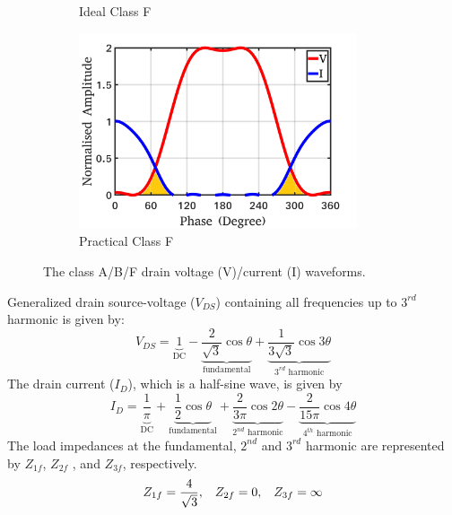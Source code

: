 \documentclass[conference]{IEEEtran}
\begin{document}
\begin{figure}[!t]
\begin{subfigure}{0.24\textwidth}
\caption{Ideal Class F}
\label{fig:ICF_wave_VI}
\end{subfigure}
\begin{subfigure}{0.24\textwidth}
\includegraphics[width=0.9\textwidth]{Images/Intro/CF_wave_VI_shaded.jpg}
\caption{Practical Class F}
\label{fig:CF_wave_VI}
\end{subfigure}
\caption{The class A/B/F drain  voltage (V)/current (I) waveforms. \color{black}}
\label{fig:wave_VI}
\vspace{-0.25in}
\end{figure}
Generalized drain source\color{blue}-\color{black}voltage ($V_{DS}$) containing all frequencies up to $3^{rd}$ harmonic \cite{Gen_Vds_eqn} is given by:
\begin{equation}
V_{DS}=\underbrace{1}_{\text{DC}}-\underbrace{\frac{2}{\sqrt{3}} \cos \theta}_{\text{fundamental}}+\underbrace{\frac{1}{3 \sqrt{3}} \cos 3 \theta}_{\text{$3^{rd}$ harmonic}}
\label{eqn_CF_V}
\end{equation}
\color{blue} The drain \color{black}  current ($I_{D}$)\color{blue}, which is a half-sine wave, \color{black} is given by
\begin{equation}
I_{D}=\underbrace{\frac{1}{\pi}}_{\text{DC}}+\underbrace{\frac{1}{2} \cos \theta}_{\text{fundamental}}+\underbrace{\frac{2}{3 \pi} \cos 2 \theta}_{\text{$2^{nd}$ harmonic}}-\underbrace{\frac{2}{15 \pi} \cos 4 \theta}_{\text{$4^{th}$ harmonic}}
\label{eqn_CCF_I}
\end{equation}
\color{blue} The load impedances at the fundamental, $2^{nd}$ and $3^{rd}$ harmonic \color{black}  are represented by $Z_{1f}$, $Z_{2f}$\color{blue} , and $Z_{3f}$, \color{black} respectively.
\begin{equation}
\begin{aligned}
Z_{1f}=\frac{4}{\sqrt{3}}, \hspace{3mm}
Z_{2f}=0, \hspace{3mm}
Z_{3f}=\infty
\end{aligned}
\label{eqn_CF}
\end{equation}
\end{document}

